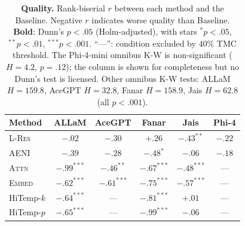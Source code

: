 \documentclass[11pt]{article}
\begin{document}
\begin{table}[h]
\centering
\small
\setlength{\tabcolsep}{4pt}
\renewcommand{\arraystretch}{1.15}
\caption{%
\textbf{Quality.} Rank-biserial $r$ between each method and the
Baseline. Negative $r$ indicates worse quality than Baseline.
\textbf{Bold}: Dunn's $p\!<\!.05$ (Holm-adjusted), with stars
$^{*}p\!<\!.05$, $^{**}p\!<\!.01$, $^{***}p\!<\!.001$.
``---'': condition excluded by 40\% TMC threshold.
The Phi-4-mini omnibus K-W is non-significant ($H\!=\!4.2$,
$p\!=\!.12$); the column is shown for completeness but no Dunn's
test is licensed.
Other omnibus K-W tests: ALLaM $H\!=\!159.8$,
AceGPT $H\!=\!32.8$, Fanar $H\!=\!158.9$, Jais $H\!=\!62.8$
(all $p\!<\!.001$).}
\label{tab:dunn-q}
\begin{tabular}{l c c c c c}
\toprule
\textbf{Method} & ALLaM & AceGPT & Fanar & Jais & Phi-4 \\
\midrule
\textsc{L-Res} & $-.02$ & $-.30$ & $+.26$ & $\mathbf{-.43^{**}}$  & $-.22$ \\
\textsc{AENI}  & $-.39$ & $-.28$ & $\mathbf{-.48^{*}}$  & $-.06$ & $-.18$ \\
\midrule
\textsc{Attn}  & $\mathbf{-.99^{***}}$ & $\mathbf{-.46^{**}}$  & $\mathbf{-.67^{***}}$ & $\mathbf{-.48^{***}}$ & --- \\
\textsc{Embed} & $\mathbf{-.62^{***}}$ & $\mathbf{-.61^{***}}$ & $\mathbf{-.75^{***}}$ & $\mathbf{-.57^{***}}$ & --- \\
HiTemp-$k$     & $\mathbf{-.64^{***}}$ & ---                   & $\mathbf{-.81^{***}}$ & $+.01$                & --- \\
HiTemp-$p$     & $\mathbf{-.65^{***}}$ & ---                   & $\mathbf{-.99^{***}}$ & $-.06$                & --- \\
\bottomrule
\end{tabular}
\end{table}
\end{document}
